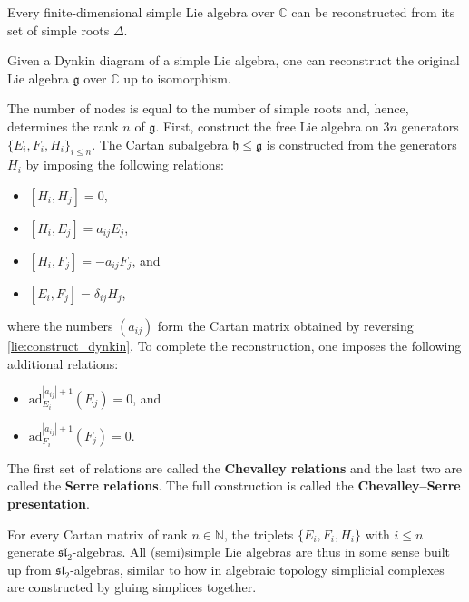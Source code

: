     \begin{theorem}
        Every finite-dimensional simple Lie algebra over $\mathbb{C}$ can be reconstructed from its set of simple roots $\Delta$.
    \end{theorem}
    \begin{construct}\label{lie:reconstruction}
        Given a Dynkin diagram of a simple Lie algebra, one can reconstruct the original Lie algebra $\mathfrak{g}$ over $\mathbb{C}$ up to isomorphism.

        The number of nodes is equal to the number of simple roots and, hence, determines the rank $n$ of $\mathfrak{g}$. First, construct the free Lie algebra on $3n$ generators $\{E_i,F_i,H_i\}_{i\leq n}$. The Cartan subalgebra $\mathfrak{h}\leq\mathfrak{g}$ is constructed from the generators $H_i$ by imposing the following relations:
        \begin{itemize}
            \item $[H_i,H_j] = 0$,
            \item $[H_i,E_j] = a_{ij}E_j$,
            \item $[H_i,F_j] = -a_{ij}F_j$, and
            \item $[E_i,F_j] = \delta_{ij}H_j$,
        \end{itemize}
        where the numbers $(a_{ij})$ form the Cartan matrix obtained by reversing \cref{lie:construct_dynkin}. To complete the reconstruction, one imposes the following additional relations:
        \begin{itemize}
            \item $\mathrm{ad}_{E_i}^{|a_{ij}|+1}(E_j) = 0$, and
            \item $\mathrm{ad}_{F_i}^{|a_{ij}|+1}(F_j) = 0$.
        \end{itemize}
        The first set of relations are called the \textbf{Chevalley relations} and the last two are called the \textbf{Serre relations}. The full construction is called the \textbf{Chevalley--Serre presentation}.
    \end{construct}

    \begin{property}[$\mathfrak{sl}_2$]
        For every Cartan matrix of rank $n\in\mathbb{N}$, the triplets $\{E_i,F_i,H_i\}$ with $i\leq n$ generate $\mathfrak{sl}_2$-algebras. All (semi)simple Lie algebras are thus in some sense built up from $\mathfrak{sl}_2$-algebras, similar to how in algebraic topology simplicial complexes are constructed by gluing simplices together.
    \end{property}

